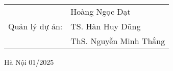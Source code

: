 \begin{titlepage}
\begin{center}
\begin{table}[H]
\begin{tabular}{l l}
              &\fontsize{14pt}{0pt}\selectfont Hoàng Ngọc Đạt \vspace{10pt} \\
            \fontsize{14pt}{0pt}\selectfont Quản lý dự án: & \fontsize{14pt}{0pt}\selectfont TS. Hàn Huy Dũng \\   
              &\fontsize{14pt}{0pt}\selectfont ThS. Nguyễn Minh Thắng \vspace{6pt} \\
       \end{tabular}
  \end{table}
  \vspace{6cm}
  \fontsize{14pt}{0pt}\selectfont Hà Nội 01/2025
  \end{center}
\end{titlepage}